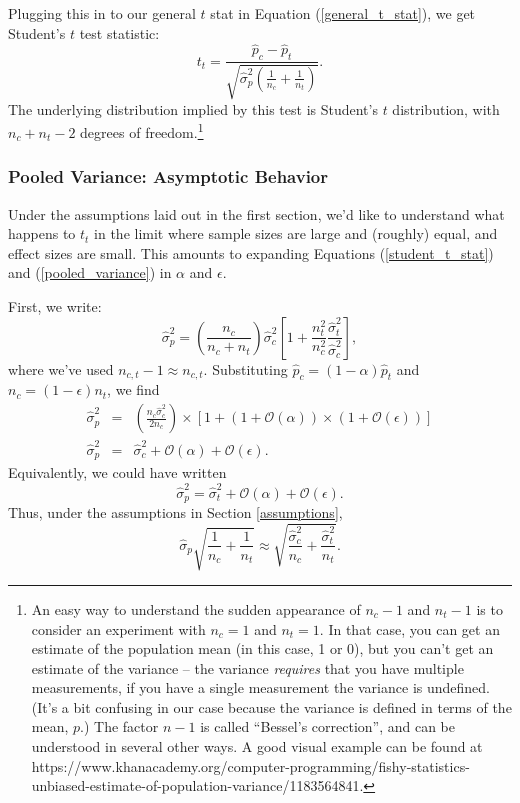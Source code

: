 \documentclass{article}
\numberwithin{equation}{section}
\begin{document}
Plugging this in to our general $t$ stat in Equation (\ref{general_t_stat}), we get Student's $t$ test statistic:
\begin{equation} \label{student_t_stat}
	t_t = \frac{\hat{p}_c - \hat{p}_t}{\sqrt{\hat{\sigma}_p^2\left(\frac{1}{n_c} + \frac{1}{n_t}\right)}}.
\end{equation}
The underlying distribution implied by this test is Student's $t$ distribution, with $n_c + n_t - 2$ degrees of freedom.\footnote{An easy way to understand the sudden appearance of $n_c-1$ and $n_t-1$ is to consider an experiment with $n_c = 1$ and $n_t = 1$. In that case, you can get an estimate of the population mean (in this case, 1 or 0), but you can't get an estimate of the variance -- the variance \textit{requires} that you have multiple measurements, if you have a single measurement the variance is undefined. (It's a bit confusing in our case because the variance is defined in terms of the mean, $p$.) The factor $n-1$ is called ``Bessel's correction'', and can be understood in several other ways. A good visual example can be found at https://www.khanacademy.org/computer-programming/fishy-statistics-unbiased-estimate-of-population-variance/1183564841.}

\subsubsection{Pooled Variance: Asymptotic Behavior}
Under the assumptions laid out in the first section, we'd like to understand what happens to $t_t$ in the limit where sample sizes are large and (roughly) equal, and effect sizes are small. This amounts to expanding Equations (\ref{student_t_stat}) and (\ref{pooled_variance}) in $\alpha$ and $\epsilon$.

First, we write:
\begin{equation}
	\hat{\sigma}_p^2 = \left(\frac{n_c}{n_c + n_t}\right) \hat{\sigma}_c^2 \left[1 + \frac{n_t^2}{n_c^2}\frac{\hat{\sigma}_t^2}{\hat{\sigma}_c^2}\right],
\end{equation}
where we've used $n_{c,t} - 1 \approx n_{c,t}$. Substituting $\hat{p}_c = \left(1-\alpha\right) \hat{p}_t$ and $n_c = \left(1-\epsilon\right) n_t$, we find
\begin{eqnarray} \nonumber \label{pooled_var_large_n}
	\hat{\sigma}_p^2 &=& \left(\frac{n_c \hat{\sigma}_c^2}{2n_c}\right) \times \left[1 + \left(1 + \mathcal{O}(\alpha)\right)\times\left(1 + \mathcal{O}(\epsilon)\right)\right] \\
	\hat{\sigma}_p^2 &=& \hat{\sigma}_c^2 + \mathcal{O}(\alpha) + \mathcal{O}(\epsilon).
\end{eqnarray}
Equivalently, we could have written 
\begin{equation} \label{pooled_var_large_n_alt}
	\hat{\sigma}_p^2 = \hat{\sigma}_t^2 + \mathcal{O}(\alpha) + \mathcal{O}(\epsilon).
\end{equation}
Thus, under the assumptions in Section \ref{assumptions},
\begin{equation} \label{pooled_var_large_n_final}
	\hat{\sigma}_p\sqrt{\frac{1}{n_c} + \frac{1}{n_t}} \approx \sqrt{\frac{\hat{\sigma}_c^2}{n_c} + \frac{\hat{\sigma}^2_t}{n_t}}.
\end{equation}
\end{document}
